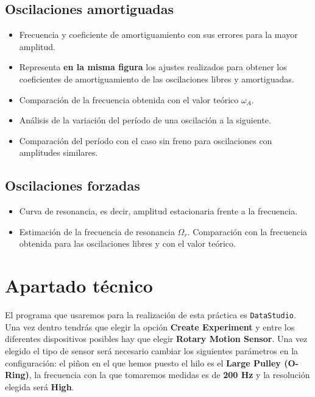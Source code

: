 \documentclass[11pt]{articulo}
\begin{document}
\subsection*{Oscilaciones amortiguadas}

\begin{itemize}

\item{Frecuencia y coeficiente de amortiguamiento con sus errores para la mayor amplitud.}
\item{Representa {\bf en la misma figura} los ajustes realizados para obtener los coeficientes de amortiguamiento de las oscilaciones libres y amortiguadas.}
\item{Comparaci\'on de la frecuencia obtenida con el valor te\'orico $\omega_A$.}
\item{An\'alisis de la variaci\'on del per\'iodo de una oscilaci\'on a la siguiente.}
\item{Comparaci\'on del per\'iodo con el caso sin freno para oscilaciones con amplitudes similares.}

\end{itemize}

\subsection*{Oscilaciones forzadas}

\begin{itemize}

\item{Curva de resonancia, es decir, amplitud estacionaria frente a la frecuencia.}
\item{Estimaci\'on de la frecuencia de resonancia $\Omega_r$. Comparaci\'on con la frecuencia obtenida para las oscilaciones libres y con el valor te\'orico.}

\end{itemize}


\section*{Apartado t\'ecnico}

El programa que usaremos para la realizaci\'on de esta pr\'actica es {\tt DataStudio}. Una vez dentro tendr\'as que elegir la opci\'on {\bf Create Experiment} y entre los diferentes dispositivos posibles hay que elegir {\bf Rotary Motion Sensor}. Una vez elegido el tipo de sensor ser\'a necesario cambiar los siguientes par\'ametros en la configuraci\'on: el pi\~non en el que hemos puesto el hilo es el {\bf Large Pulley (O-Ring)}, la frecuencia con la que tomaremos medidas es de {\bf 200 Hz} y la resoluci\'on elegida ser\'a {\bf High}.
\end{document}
